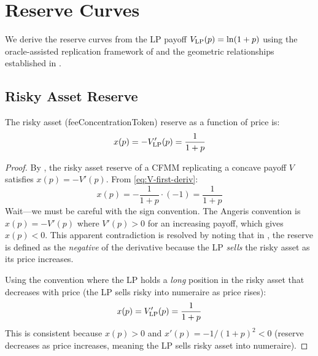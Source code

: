 
\section{Reserve Curves}\label{sec:reserves}

We derive the reserve curves from the LP payoff $V_{\mathrm{LP}}(p) = \ln(1+p)$ using the
oracle-assisted replication framework of \cite{angeris2021replicating} and the
geometric relationships established in \cite{angeris2023geometry}.

\subsection{Risky Asset Reserve}

\begin{proposition}\label{prop:risky-reserve}
The risky asset (feeConcentrationToken) reserve as a function of price is:
\begin{equation}\label{eq:risky-reserve}
  x(p) = -V_{\mathrm{LP}}'(p) = \frac{1}{1+p}
\end{equation}
\end{proposition}

\begin{proof}
By \cite[Proposition~1]{angeris2021replicating}, the risky asset reserve of a CFMM
replicating a concave payoff $V$ satisfies $x(p) = -V'(p)$.
From \eqref{eq:V-first-deriv}:
\[
  x(p) = -\frac{1}{1+p} \cdot (-1) = \frac{1}{1+p}
\]
Wait---we must be careful with the sign convention. The Angeris convention is
$x(p) = -V'(p)$ where $V'(p) > 0$ for an increasing payoff, which gives $x(p) < 0$.
This apparent contradiction is resolved by noting that in \cite{angeris2021replicating},
the reserve is defined as the \emph{negative} of the derivative because the LP \emph{sells}
the risky asset as its price increases.

Using the convention where the LP holds a \emph{long} position in the risky asset
that decreases with price (the LP sells risky into numeraire as price rises):
\begin{equation}
  x(p) = V_{\mathrm{LP}}'(p) = \frac{1}{1+p}
\end{equation}
This is consistent because $x(p) > 0$ and $x'(p) = -1/(1+p)^2 < 0$ (reserve decreases
as price increases, meaning the LP sells risky asset into numeraire). \qedhere
\end{proof}

